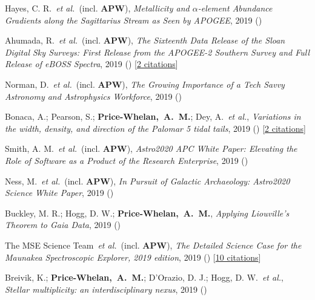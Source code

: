 \item[{\color{deemph}\scriptsize11}]Hayes, C. R.~\textit{et al.}~(incl. \textbf{APW}), \textit{Metallicity and $\alpha$-element Abundance Gradients along the Sagittarius Stream as Seen by APOGEE}, 2019 ()

\item[{\color{deemph}\scriptsize10}]Ahumada, R.~\textit{et al.}~(incl. \textbf{APW}), \textit{The Sixteenth Data Release of the Sloan Digital Sky Surveys: First Release from the APOGEE-2 Southern Survey and Full Release of eBOSS Spectra}, 2019 () [\href{http://adsabs.harvard.edu/abs/2019arXiv191202905A}{2 citations}]

\item[{\color{deemph}\scriptsize9}]Norman, D.~\textit{et al.}~(incl. \textbf{APW}), \textit{The Growing Importance of a Tech Savvy Astronomy and Astrophysics Workforce}, 2019 ()

\item[{\color{deemph}\scriptsize8}]Bonaca, A.; Pearson, S.; \textbf{Price-Whelan,~A.~M.}; Dey, A.~\textit{et al.}, \textit{Variations in the width, density, and direction of the Palomar 5 tidal tails}, 2019 () [\href{http://adsabs.harvard.edu/abs/2019arXiv191000592B}{2 citations}]

\item[{\color{deemph}\scriptsize7}]Smith, A. M.~\textit{et al.}~(incl. \textbf{APW}), \textit{Astro2020 APC White Paper: Elevating the Role of Software as a Product of the Research Enterprise}, 2019 ()

\item[{\color{deemph}\scriptsize6}]Ness, M.~\textit{et al.}~(incl. \textbf{APW}), \textit{In Pursuit of Galactic Archaeology: Astro2020 Science White Paper}, 2019 ()

\item[{\color{deemph}\scriptsize5}]Buckley, M. R.; Hogg, D. W.; \textbf{Price-Whelan,~A.~M.}, \textit{Applying Liouville's Theorem to Gaia Data}, 2019 ()

\item[{\color{deemph}\scriptsize4}]The MSE Science Team~\textit{et al.}~(incl. \textbf{APW}), \textit{The Detailed Science Case for the Maunakea Spectroscopic Explorer, 2019 edition}, 2019 () [\href{http://adsabs.harvard.edu/abs/2019arXiv190404907T}{10 citations}]

\item[{\color{deemph}\scriptsize3}]Breivik, K.; \textbf{Price-Whelan,~A.~M.}; D'Orazio, D. J.; Hogg, D. W.~\textit{et al.}, \textit{Stellar multiplicity: an interdisciplinary nexus}, 2019 ()

